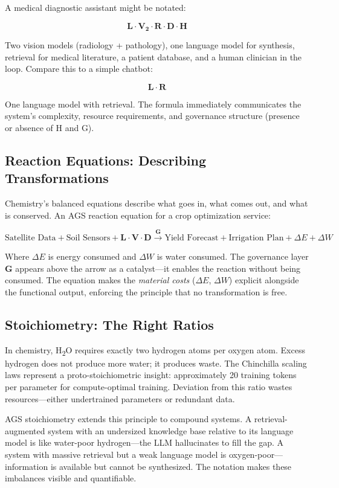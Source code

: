 \documentclass[12pt]{article}
\begin{document}
A medical diagnostic assistant might be notated:

\[
\mathbf{L \cdot V_2 \cdot R \cdot D \cdot H}
\]

Two vision models (radiology + pathology), one language model for synthesis, retrieval for medical literature, a patient database, and a human clinician in the loop. Compare this to a simple chatbot:

\[
\mathbf{L \cdot R}
\]

One language model with retrieval. The formula immediately communicates the system's complexity, resource requirements, and governance structure (presence or absence of H and G).

\subsection{Reaction Equations: Describing Transformations}
\label{sec:reactions}

Chemistry's balanced equations describe what goes in, what comes out, and what is conserved. An AGS reaction equation for a crop optimization service:

\[
\text{Satellite Data} + \text{Soil Sensors} + \mathbf{L \cdot V \cdot D} \xrightarrow{\mathbf{G}} \text{Yield Forecast} + \text{Irrigation Plan} + \Delta E + \Delta W
\]

Where $\Delta E$ is energy consumed and $\Delta W$ is water consumed. The governance layer \textbf{G} appears above the arrow as a catalyst---it enables the reaction without being consumed. The equation makes the \emph{material costs} ($\Delta E$, $\Delta W$) explicit alongside the functional output, enforcing the principle that no transformation is free.

\subsection{Stoichiometry: The Right Ratios}
\label{sec:stoichiometry}

In chemistry, H\textsubscript{2}O requires exactly two hydrogen atoms per oxygen atom. Excess hydrogen does not produce more water; it produces waste. The Chinchilla scaling laws \citep{hoffmann2022} represent a proto-stoichiometric insight: approximately 20 training tokens per parameter for compute-optimal training. Deviation from this ratio wastes resources---either undertrained parameters or redundant data.

AGS stoichiometry extends this principle to compound systems. A retrieval-augmented system with an undersized knowledge base relative to its language model is like water-poor hydrogen---the LLM hallucinates to fill the gap. A system with massive retrieval but a weak language model is oxygen-poor---information is available but cannot be synthesized. The notation makes these imbalances visible and quantifiable.
\end{document}
